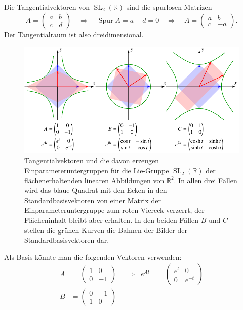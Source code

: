 \begin{beispiel}
Die Tangentialvektoren von $\operatorname{SL}_2(\mathbb{R})$ sind 
die spurlosen Matrizen
\[
A=\begin{pmatrix}a&b\\c&d\end{pmatrix}
\quad\Rightarrow\quad
\operatorname{Spur}A=a+d=0
\quad\Rightarrow\quad
A=\begin{pmatrix}a&b\\c&-a\end{pmatrix}.
\]
Der Tangentialraum ist also dreidimensional.
\begin{figure}
\centering
\includegraphics{chapters/60-gruppen/images/sl2.pdf}
\caption{Tangentialvektoren und die davon erzeugen Einparameteruntergruppen
für die Lie-Gruppe $\operatorname{SL}_2(\mathbb{R})$ der flächenerhaltenden
linearen Abbildungen von $\mathbb{R}^2$.
In allen drei Fällen wird das blaue Quadrat mit den Ecken in den
Standardbasisvektoren von einer Matrix der Einparameteruntergruppe 
zum roten Viereck verzerrt, der Flächeninhalt bleibt aber erhalten.
In den beiden Fällen $B$ und $C$ stellen die grünen Kurven die Bahnen
der Bilder der Standardbasisvektoren dar.
\label{buch:gruppen:fig:sl2}}
\end{figure}%
Als Basis könnte man die folgenden Vektoren verwenden:
\begin{align*}
A
&=
\begin{pmatrix}1&0\\0&-1\end{pmatrix}
&&\Rightarrow&
e^{At}
&=
\begin{pmatrix} e^t & 0 \\ 0 & e^{-t} \end{pmatrix}
\\
B
&=
\begin{pmatrix}0&-1\\1&0\end{pmatrix}

\end{align*}
\end{beispiel}
